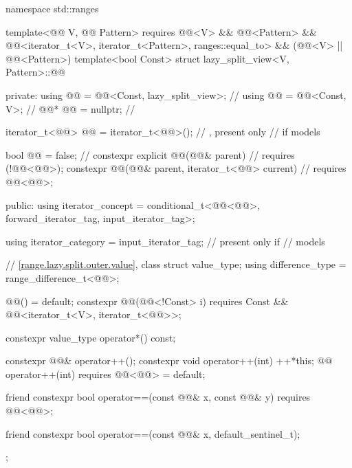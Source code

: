 %
\begin{codeblock}
namespace std::ranges {
  template<@@ V, @@ Pattern>
    requires @@<V> && @@<Pattern> &&
             @@<iterator_t<V>, iterator_t<Pattern>, ranges::equal_to> &&
             (@@<V> || @@<Pattern>)
  template<bool Const>
  struct lazy_split_view<V, Pattern>::@@ {
  private:
    using @@ = @@<Const, lazy_split_view>;     // \expos
    using @@ = @@<Const, V>;                     // \expos
    @@* @@ = nullptr;                              // \expos

    iterator_t<@@> @@ = iterator_t<@@>();         // \expos, present only
                                                            // if  models 

    bool @@ = false;                           // \expos
    constexpr explicit @@(@@& parent)      // \expos
      requires (!@@<@@>);
    constexpr @@(@@& parent, iterator_t<@@> current)    // \expos
      requires @@<@@>;

  public:
    using iterator_concept  =
      conditional_t<@@<@@>, forward_iterator_tag, input_iterator_tag>;

    using iterator_category = input_iterator_tag;           // present only if 
                                                            // models 

    // \ref{range.lazy.split.outer.value}, class 
    struct value_type;
    using difference_type   = range_difference_t<@@>;

    @@() = default;
    constexpr @@(@@<!Const> i)
      requires Const && @@<iterator_t<V>, iterator_t<@@>>;

    constexpr value_type operator*() const;

    constexpr @@& operator++();
    constexpr void operator++(int) {
      ++*this;
    }
    @@ operator++(int) requires @@<@@> = default;

    friend constexpr bool operator==(const @@& x, const @@& y)
      requires @@<@@>;

    friend constexpr bool operator==(const @@& x, default_sentinel_t);
  };
}
\end{codeblock}

